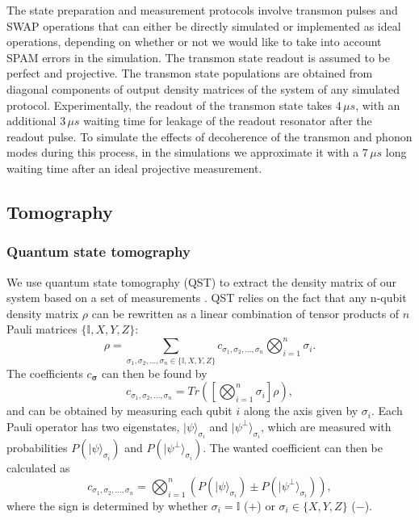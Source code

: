 \documentclass[12pt]{article}
\newcommand{\ket}[1]{\ensuremath{|{#1}\rangle}}
\begin{document}
The state preparation and measurement protocols involve transmon pulses and SWAP operations that can either be directly simulated or implemented as ideal operations, depending on whether or not we would like to take into account SPAM errors in the simulation. The transmon state readout is assumed to be perfect and projective. The transmon state populations are obtained from diagonal components of output density matrices of the system of any simulated protocol. Experimentally, the readout of the transmon state takes $4 \, \text{$\mu s$}$, with an additional $3 \, \text{$\mu s$}$ waiting time for leakage of the readout resonator after the readout pulse. To simulate the effects of decoherence of the transmon and phonon modes during this process, in the simulations we approximate it with a $7 \, \text{$\mu s$}$ long waiting time after an ideal projective measurement.

\subsection{Tomography}

\subsubsection{Quantum state tomography}
\label{QST}
We use quantum state tomography (QST) to extract the density matrix of our system based on a set of measurements \cite{altepeter20044}.
QST relies on the fact that any n-qubit density matrix $\rho$ can be rewritten as a linear combination of tensor products of $n$ Pauli matrices $\{\mathbb{I} , X, Y, Z\}$:
\begin{equation}
\rho = \sum_{\sigma_1,\sigma_2,...,\sigma_n \in \{\mathbb{I} , X, Y, Z\}} c_{\sigma_1,\sigma_2,...,\sigma_n} \bigotimes_{i=1}^{n} \sigma_i.
\end{equation}
The coefficients $c_{\boldsymbol{\sigma}}$ can then be found by
\begin{equation}
c_{\sigma_1,\sigma_2,...,\sigma_n} = Tr\left(\left[\bigotimes_{i=1}^{n} \sigma_i\right] \rho\right),
\end{equation}
and can be obtained by measuring each qubit $i$ along the axis given by $\sigma_i$. Each Pauli operator has two eigenstates, $\ket{\psi}_{\sigma_i}$ and $\ket{\psi^{\perp}}_{\sigma_i}$, which are measured with probabilities $P(\ket{\psi}_{\sigma_i})$ and $P(\ket{\psi^{\perp}}_{\sigma_i})$. The wanted coefficient can then be calculated as
\begin{equation}
c_{\sigma_1,\sigma_2,...,\sigma_n} = \bigotimes_{i=1}^{n} \left( P(\ket{\psi}_{\sigma_i}) \pm  P(\ket{\psi^{\perp}}_{\sigma_i})\right),
\end{equation}
where the sign is determined by whether $\sigma_i = \mathbb{I}$ ($+$) or $\sigma_i \in \{X,Y,Z\}$ ($-$).
\end{document}
